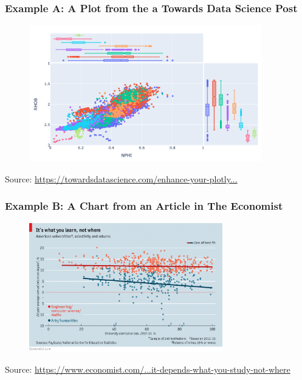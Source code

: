 \documentclass[aspectratio=1610]{beamer}
\begin{document}
\begin{frame}
	\frametitle{Example A: A Plot from the a Towards Data Science Post}
	\begin{figure}
		\begin{small}
			\begin{center}
				\includegraphics[width=0.9\textwidth]{images/plotly_scatter.png}
			\end{center}
		\end{small}
	\end{figure}

	\vspace{-1em}

	\footnotesize
	Source: \href{https://towardsdatascience.com/enhance-your-plotly-express-scatter-plot-with-marginal-plots-de469d42f12a}
	{https://towardsdatascience.com/enhance-your-plotly...}
\end{frame}

\begin{frame}
	\frametitle{Example B: A Chart from an Article in The Economist}
	\begin{figure}
		\begin{small}
			\begin{center}
				\includegraphics[width=0.75\textwidth]{images/economist_scatter.png}
			\end{center}
		\end{small}
	\end{figure}

	\footnotesize
	Source: \href{https://www.economist.com/united-states/2015/03/12/it-depends-what-you-study-not-where}
	{https://www.economist.com/...it-depends-what-you-study-not-where}
\end{frame}
\end{document}
